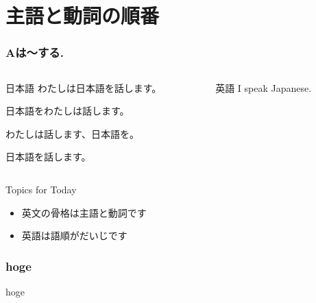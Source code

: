 \documentclass[aspectratio=169]{beamer}
\newcommand{\myEmph}[3]{%
    \textbf<#1>{\color<#1>{#2}{#3}}%
}
\begin{document}
\section{主語と動詞の順番}
\begin{frame}[plain]\frametitle{Aは〜する.}

\begin{columns}
\begin{column}[t]{.45\textwidth}
\begin{block}{日本語}
わたしは日本語を話します。\pause

日本語をわたしは話します。\pause

わたしは話します、日本語を。\pause

日本語を話します。
\end{block}
\end{column}
\pause
\begin{column}[t]{.45\textwidth}
\begin{block}{英語}
I speak Japanese.
\end{block}
\end{column}
\end{columns}


\bigskip
\pause
\begin{exampleblock}{Topics for Today}
\begin{itemize}
 \item   英文の骨格は主語と動詞です
 \item   英語は語順がだいじです
\end{itemize}
     \end{exampleblock}
\end{frame}

\begin{frame}[plain]\frametitle{hoge}


hoge

\textbf<1->{\color<2>{red}{oyoyo}} 
\textbf<2>{}
\myEmph{1-2}{blue}{foobar}

\end{frame}
\end{document}
